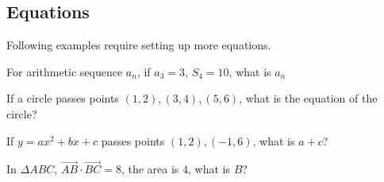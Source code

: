 \subsection{Equations}

Following examples require setting up more equations.

\begin{example}
  For arithmetic sequence $a_n$, if $a_3 = 3$, $S_4=10$, what is $a_n$
\end{example}

\begin{example}
  If a circle passes points $(1,2), (3,4), (5,6)$, what is the equation of the circle?
\end{example}

\begin{example}
  If $y = ax^2 + bx + c$ passes points $(1, 2), (-1, 6)$, what is $a + c$?
\end{example}

\begin{example}
  In $\Delta ABC$, $\overrightarrow{AB}\cdot \overrightarrow{BC} = 8$, the area is $4$, what is $B$?
\end{example}
